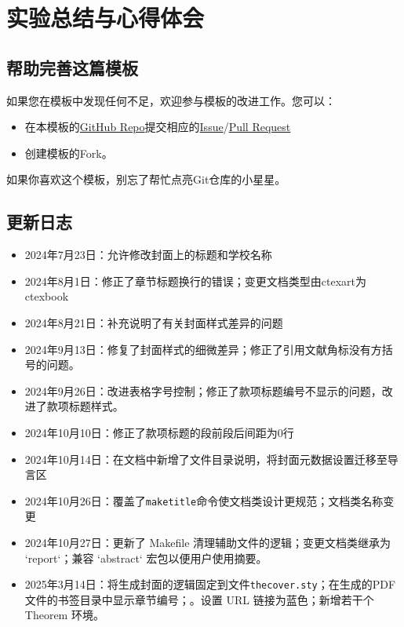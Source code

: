 \chapter{实验总结与心得体会}

\section{帮助完善这篇模板}\label{sec:joinus}

如果您在模板中发现任何不足，欢迎参与模板的改进工作。您可以：

\begin{itemize}
    \item 在本模板的\href{https://github.com/GitHubonline1396529/dlmuucexpreport}{GitHub Repo}提交相应的\href{https://github.com/GitHubonline1396529/dlmuucexpreport/issues}{Issue}/\href{https://github.com/GitHubonline1396529/dlmuucexpreport/pulls}{Pull Request}
    \item 创建模板的Fork。
\end{itemize}

如果你喜欢这个模板，别忘了帮忙点亮Git仓库的小星星。

\section{更新日志}

\begin{itemize}
    \item 2024年7月23日：允许修改封面上的标题和学校名称
    \item 2024年8月1日：修正了章节标题换行的错误；变更文档类型由ctexart为ctexbook
    \item 2024年8月21日：补充说明了有关封面样式差异的问题
    \item 2024年9月13日：修复了封面样式的细微差异；修正了引用文献角标没有方括号的问题。
    \item 2024年9月26日：改进表格字号控制；修正了款项标题编号不显示的问题，改进了款项标题样式。
    \item 2024年10月10日：修正了款项标题的段前段后间距为0行
    \item 2024年10月14日：在文档中新增了文件目录说明，将封面元数据设置迁移至导言区
    \item 2024年10月26日：覆盖了\texttt{maketitle}命令使文档类设计更规范；文档类名称变更
    \item 2024年10月27日：更新了 Makefile 清理辅助文件的逻辑；变更文档类继承为 `report`；兼容 `abstract` 宏包以便用户使用摘要。
    \item 2025年3月14日：将生成封面的逻辑固定到文件\texttt{thecover.sty}；在生成的PDF文件的书签目录中显示章节编号；。设置 URL 链接为蓝色；新增若干个 Theorem 环境。
\end{itemize}
